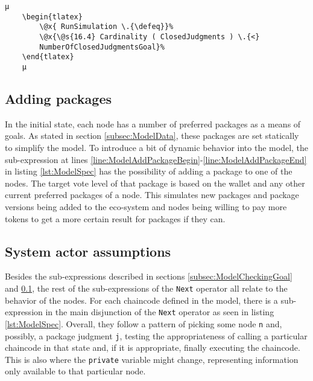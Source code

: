 \begin{lstlisting}[caption=Test to check if model checking goal is met
                    , label=lst:RunSimulation]
    µ
    \begin{tlatex}
        \@x{ RunSimulation \.{\defeq}}%
        \@x{\@s{16.4} Cardinality ( ClosedJudgments ) \.{<}
        NumberOfClosedJudgmentsGoal}%
    \end{tlatex}
    µ
\end{lstlisting}

\subsection{Adding packages}
\label{subsec:ModelAddingPackages}

In the initial state, each node has a number of preferred packages as a means of goals. As stated in section \ref{subsec:ModelData}, these packages are set statically to simplify the model. To introduce a bit of dynamic behavior into the model, the sub-expression at lines \ref{line:ModelAddPackageBegin}-\ref{line:ModelAddPackageEnd} in listing \ref{lst:ModelSpec} has the possibility of adding a package to one of the nodes. The target vote level of that package is based on the wallet and any other current preferred packages of a node. This simulates new packages and package versions being added to the eco-system and nodes being willing to pay more tokens to get a more certain result for packages if they can.

\subsection{System actor assumptions}

Besides the sub-expressions described in sections \ref{subsec:ModelCheckingGoal} and \ref{subsec:ModelAddingPackages}, the rest of the sub-expressions of the \texttt{Next} operator all relate to the behavior of the nodes. For each chaincode defined in the model, there is a sub-expression in the main disjunction of the \texttt{Next} operator as seen in listing \ref{lst:ModelSpec}. Overall, they follow a pattern of picking some node \texttt{n} and, possibly, a package judgment \texttt{j}, testing the appropriateness of calling a particular chaincode in that state and, if it is appropriate, finally executing the chaincode. This is also where the \texttt{private} variable might change, representing information only available to that particular node.

